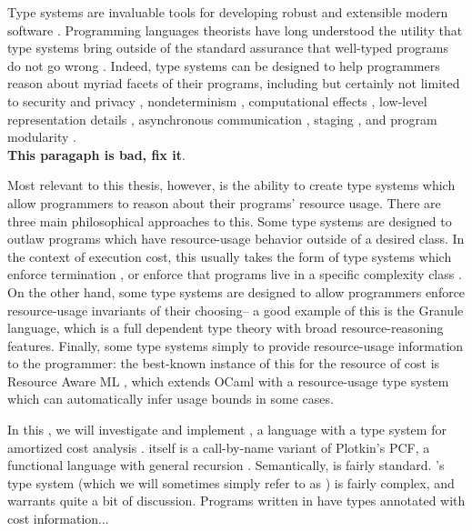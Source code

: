 Type systems are invaluable tools for developing robust and extensible modern software \citehere. Programming languages theorists have long understood the utility that type systems bring outside of the standard assurance that well-typed programs do not go wrong \citehere. Indeed, type systems can be designed to help programmers reason about myriad facets of their programs, including but certainly not limited to security and privacy \citehere, nondeterminism \citehere, computational effects \citehere, low-level representation details , asynchronous communication , staging \citehere, and program modularity . 
\\

\textbf{This paragaph is bad, fix it}.

Most relevant to this thesis, however, is the ability to create type systems which allow programmers to reason about their programs' resource usage. There are three main philosophical approaches to this. Some type systems are designed to outlaw programs which have resource-usage behavior outside of a desired class. In the context of execution cost, this usually takes the form of type systems which enforce termination \citehere, or enforce that programs live in a specific complexity class \citehere. On the other hand, some type systems are designed to allow programmers enforce resource-usage invariants of their choosing-- a good example of this is the Granule \citehere language, which is a full dependent type theory with broad resource-reasoning features. Finally, some type systems simply to provide resource-usage information to the programmer: the best-known instance of this for the resource of cost is Resource Aware ML \citehere, which extends OCaml with a resource-usage type system which can automatically infer usage bounds in some cases.

In this , we will investigate and implement \lambdaamor, a language with a type system for amortized cost analysis \citep{rajani-et-al:popl21}. \lambdaamor itself is a call-by-name variant of Plotkin's PCF, a functional language with general recursion \citehere. Semantically, \lambdaamor is fairly standard.
 \lambdaamor's type system (which we will sometimes simply refer to as \lambdaamor) is fairly complex, and warrants quite a bit of discussion. Programs written in \lambdaamor have types annotated with cost information...

